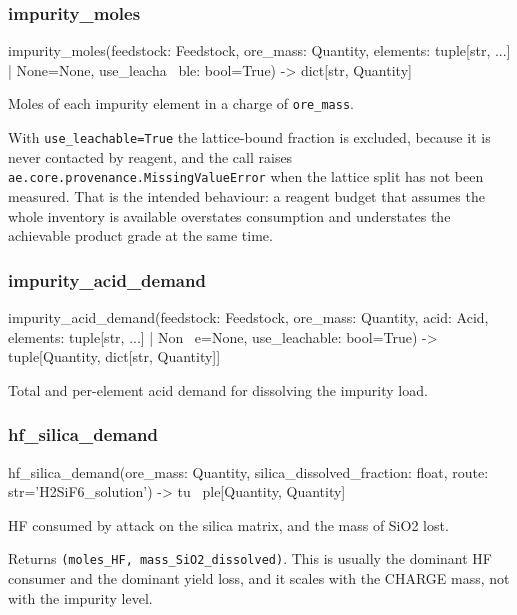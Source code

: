 \documentclass[10pt,a4paper,twoside]{report}
\begin{document}
\subsubsection*{impurity\_moles}

\begin{verbatimsmall}
impurity_moles(feedstock: Feedstock, ore_mass: Quantity, elements: tuple[str, ...] | None=None, use_leacha
    \ ble: bool=True) -> dict[str, Quantity]
\end{verbatimsmall}

Moles of each impurity element in a charge of \texttt{ore\_mass}.

With \texttt{use\_leachable=True} the lattice-bound fraction is excluded, because it is never contacted by reagent, and the call raises \texttt{ae.core.provenance.MissingValueError} when the lattice split has not been measured. That is the intended behaviour: a reagent budget that assumes the whole inventory is available overstates consumption and understates the achievable product grade at the same time.

\subsubsection*{impurity\_acid\_demand}

\begin{verbatimsmall}
impurity_acid_demand(feedstock: Feedstock, ore_mass: Quantity, acid: Acid, elements: tuple[str, ...] | Non
    \ e=None, use_leachable: bool=True) -> tuple[Quantity, dict[str, Quantity]]
\end{verbatimsmall}

Total and per-element acid demand for dissolving the impurity load.

\subsubsection*{hf\_silica\_demand}

\begin{verbatimsmall}
hf_silica_demand(ore_mass: Quantity, silica_dissolved_fraction: float, route: str='H2SiF6_solution') -> tu
    \ ple[Quantity, Quantity]
\end{verbatimsmall}

HF consumed by attack on the silica matrix, and the mass of SiO2 lost.

Returns \texttt{(moles\_HF, mass\_SiO2\_dissolved)}. This is usually the dominant HF consumer and the dominant yield loss, and it scales with the CHARGE mass, not with the impurity level.
\end{document}
